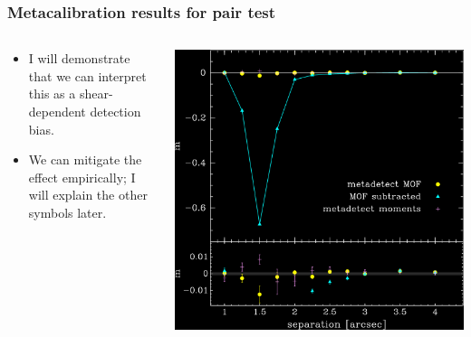 \documentclass{beamer}
\begin{document}
\begin{frame}
    \frametitle{Metacalibration results for pair test}

 
    \begin{columns}
        \begin{column}{0.4\textwidth}
            \begin{itemize}

                \item I will demonstrate that we can interpret this as a
                    {\color{lightsteelblue} shear-dependent detection bias}.

                \item We can mitigate the effect empirically; I will explain
                    the other symbols later.

            \end{itemize}
        \end{column}
        \begin{column}{0.6\textwidth}
            \begin{center}
                \includegraphics[width=\columnwidth]{pairs-mc-bdkpair-negate.png}
            \end{center}
        \end{column}
    \end{columns}
\end{frame}
\end{document}
